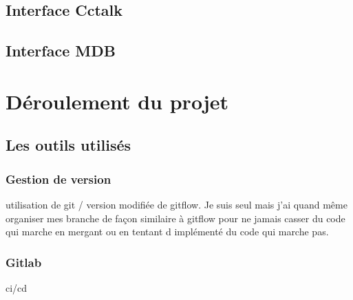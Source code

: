 \documentclass[a4paper]{article}
\begin{document}
\subsection{Interface Cctalk}


\subsection{Interface MDB}



\section{Déroulement du projet}

\subsection{Les outils utilisés}

\subsubsection{Gestion de version}

utilisation de git / version modifiée de gitflow. Je suis seul mais j'ai quand
même organiser mes branche de façon similaire à gitflow pour ne jamais casser du
code qui marche en mergant ou en tentant d implémenté du code qui marche pas.

\subsubsection{Gitlab}

ci/cd

\end{document}
